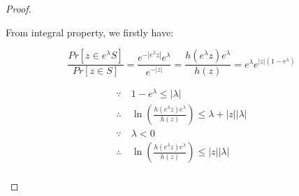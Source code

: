 \documentclass{article}
\begin{document}
\begin{proof}
\begin{itemize}





	From integral property, we firstly have:

	\begin{equation*}
	\frac{Pr[z\in e^{\lambda} S]}{Pr[z\in S]} 
	= \frac{e^{-|e^{\lambda}z|} e^{\lambda}}{e^{-|z|}} 
	= \frac{h(e^{\lambda} z) e^{\lambda}}{h(z)} 
	= e^{\lambda}e^{|z|(1 - e^{\lambda})}
	\end{equation*}



	\begin{equation*}
	\begin{split}
	\because\	& 1 - e^{\lambda} \leq |\lambda| \\
	\therefore\	& \ln (\frac{h(e^{\lambda} z) e^{\lambda}}{h(z)} )
	\leq \lambda + |z||\lambda|\\
	\because\	& \lambda < 0\\
	\therefore\	& \ln (\frac{h(e^{\lambda} z) e^{\lambda}}{h(z)} )
	\leq |z||\lambda|\\
	\end{split}
	\end{equation*}


\end{itemize}
\end{proof}
\end{document}
